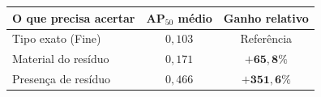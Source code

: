 \begin{tabular}{lcc}
\toprule
\textbf{O que precisa acertar} & \textbf{AP$_{50}$ médio} & \textbf{Ganho relativo} \\
\midrule
Tipo exato (Fine) & $0{,}103$ & Referência \\
Material do resíduo & $0{,}171$ & $\mathbf{+65{,}8\%}$ \\
Presença de resíduo & $0{,}466$ & $\mathbf{+351{,}6\%}$ \\
\bottomrule
\end{tabular}
